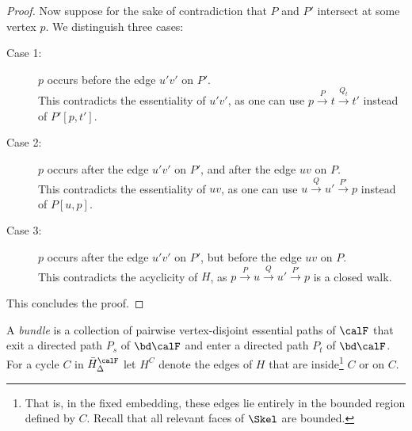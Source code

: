 \begin{proof}
Now suppose for the sake of contradiction that $P$ and $P'$ intersect at some vertex $p$. We distinguish three cases:
\begin{description}
\item[Case 1:] $p$ occurs before the edge $u'v'$ on $P'$.\\
This contradicts the essentiality of $u'v'$, as one can use $p \xrightarrow{P} t \xrightarrow{Q_t} t'$ instead of $P'[p,t']$.
\item[Case 2:] $p$ occurs after the edge $u'v'$ on $P'$, and after the edge $uv$ on $P$.\\
This contradicts the essentiality of $uv$, as one can use $u \xrightarrow{Q} u' \xrightarrow{P'} p$ instead of $P[u,p]$.
\item[Case 3:] $p$ occurs after the edge $u'v'$ on $P'$, but before the edge $uv$ on $P$.\\
This contradicts the acyclicity of $H$, as $p \xrightarrow{P} u \xrightarrow{Q} u' \xrightarrow{P'} p$ is a closed walk.
\end{description}

This concludes the proof.
\end{proof}

A \emph{bundle} is a collection of pairwise vertex-disjoint essential paths of $\calF$ that exit a directed path $P_s$ of $\bd \calF$ and enter a directed path $P_t$ of $\bd\calF$. For a cycle $C$ in $\bar{H}^\calF_\Delta$ let $H^C$ denote the edges of $H$ that are inside\footnote{That is, in the fixed embedding, these edges lie entirely in the bounded region defined by $C$. Recall that all relevant faces of $\Skel$ are bounded.} $C$ or on $C$.

